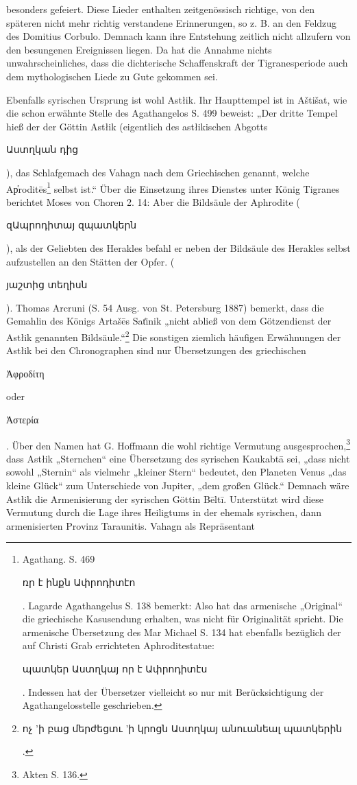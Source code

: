 \documentclass{article}
\begin{document}
besonders gefeiert. Diese Lieder enthalten zeitgenössisch richtige, von den späteren nicht mehr richtig verstandene Erinnerungen, so z. B. an den Feldzug des Domitius Corbulo. Demnach kann ihre Entstehung zeitlich nicht allzufern von den besungenen Ereignissen liegen. Da hat die Annahme nichts unwahrscheinliches, dass die dichterische Schaffenskraft der Tigranesperiode auch dem mythologischen Liede zu Gute gekommen sei.

Ebenfalls syrischen Ursprung ist wohl Astłik. Ihr Haupttempel ist in Aštišat, wie die schon erwähnte Stelle des Agathangelos S. 499 beweist: „Der dritte Tempel hieß der der Göttin Astłik (eigentlich des astłikischen Abgotts \begin{armenian}Աստղկան դից\end{armenian}), das Schlafgemach des Vahagn nach dem Griechischen genannt, welche Ap̔roditēs\footnote{Agathang. S. 469 \begin{armenian}ռր է ինքն Ափրոդիտէո\end{armenian}. Lagarde Agathangelus S. 138 bemerkt: Also hat das armenische „Original“ die griechische Kasusendung erhalten, was nicht für Originalität spricht. Die armenische Übersetzung des Mar Michael S. 134 hat ebenfalls bezüglich der auf Christi Grab errichteten Aphroditestatue: \begin{armenian}պատկեր Աստղկայ որ է Ափրոդիտէս\end{armenian}. Indessen hat der Übersetzer vielleicht so nur mit Berücksichtigung der Agathangelosstelle geschrieben.} selbst ist.“ Über die Einsetzung ihres Dienstes unter König Tigranes berichtet Moses von Choren 2. 14: Aber die Bildsäule der Aphrodite (\begin{armenian}զԱպրոդիտայ զպատկերն\end{armenian}), als der Geliebten des Herakles befahl er neben der Bildsäule des Herakles selbst aufzustellen an den Stätten der Opfer. (\begin{armenian}յաշտից տեղիսն\end{armenian}). Thomas Arcruni (S. 54 Ausg. von St. Petersburg 1887) bemerkt, dass die Gemahlin des Königs Artašēs Sat͑inik „nicht abließ von dem Götzendienst der Astłik genannten Bildsäule.“\footnote{\begin{armenian}ոչ 'ի բաց մերժեցտւ 'ի կրոցն Աստղկայ անուանեալ պատկերին\end{armenian}.} Die sonstigen ziemlich häufigen Erwähnungen der Astłik bei den Chronographen sind nur Übersetzungen des griechischen \begin{greek}Ἀφροδίτη\end{greek} oder \begin{greek}Ἀστερία\end{greek}. Über den Namen hat G. Hoffmann die wohl richtige Vermutung ausgesprochen,\footnote{Akten S. 136.} dass Astłik „Sternchen“ eine Übersetzung des syrischen Kaukabtā sei, „dass nicht sowohl „Sternin“ als vielmehr „kleiner Stern“ bedeutet, den Planeten Venus „das kleine Glück“ zum Unterschiede von Jupiter, „dem großen Glück.“ Demnach wäre Astłik die Armenisierung der syrischen Göttin Bēltī. Unterstützt wird diese Vermutung durch die Lage ihres Heiligtums in der ehemals syrischen, dann armenisierten Provinz Taraunitis. Vahagn als Repräsentant 
\end{document}
